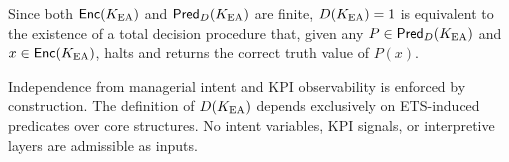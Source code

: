 \begin{remark}
Since both \(\mathsf{Enc}(K_{\mathrm{EA}})\) and \(\mathsf{Pred}_D(K_{\mathrm{EA}})\) are finite,
\(D(K_{\mathrm{EA}})=1\) is equivalent to the existence of a total decision procedure that,
given any \(P \in \mathsf{Pred}_D(K_{\mathrm{EA}})\) and \(x \in \mathsf{Enc}(K_{\mathrm{EA}})\),
halts and returns the correct truth value of \(P(x)\).
\end{remark}

\begin{remark}
Independence from managerial intent and KPI observability is enforced by
construction. The definition of \(D(K_{\mathrm{EA}})\) depends exclusively on ETS-induced
predicates over \OC{} core structures. No intent variables, KPI signals, or
interpretive layers are admissible as inputs.
\end{remark}

